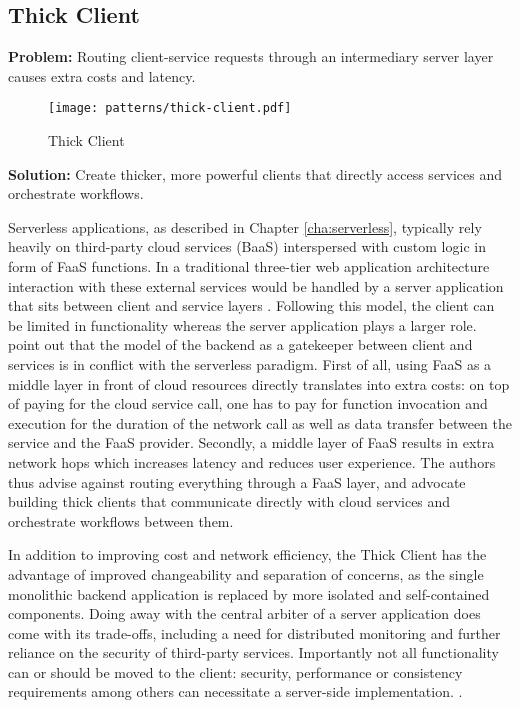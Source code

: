 \subsection{Thick Client} \label{subsec:thickClient}

\textbf{Problem:} Routing client-service requests through an intermediary server layer causes extra costs and latency.

\begin{figure}[h]
  \centering
  \texttt{[image: patterns/thick-client.pdf]}
  \caption{Thick Client}
  \label{fig:patternThickClient}
\end{figure}

\textbf{Solution:} Create thicker, more powerful clients that directly access services and orchestrate workflows.

Serverless applications, as described in Chapter \ref{cha:serverless}, typically rely heavily on third-party cloud services (BaaS) interspersed with custom logic in form of FaaS functions. In a traditional three-tier web application architecture interaction with these external services would be handled by a server application that sits between client and service layers \parencite{robert2016serverlessarchitectures}. Following this model, the client can be limited in functionality whereas the server application plays a larger role. \textcite{sbarski2017serverless} point out that the model of the backend as a gatekeeper between client and services is in conflict with the serverless paradigm. First of all, using FaaS as a middle layer in front of cloud resources directly translates into extra costs: on top of paying for the cloud service call, one has to pay for function invocation and execution for the duration of the network call as well as data transfer between the service and the FaaS provider. Secondly, a middle layer of FaaS results in extra network hops which increases latency and reduces user experience. The authors thus advise against routing everything through a FaaS layer, and advocate building thick clients that communicate directly with cloud services and orchestrate workflows between them.

In addition to improving cost and network efficiency, the Thick Client has the advantage of improved changeability and separation of concerns, as the single monolithic backend application is replaced by more isolated and self-contained components. Doing away with the central arbiter of a server application does come with its trade-offs, including a need for distributed monitoring and further reliance on the security of third-party services. Importantly not all functionality can or should be moved to the client: security, performance or consistency requirements among others can necessitate a server-side implementation. \parencite{robert2016serverlessarchitectures}.

